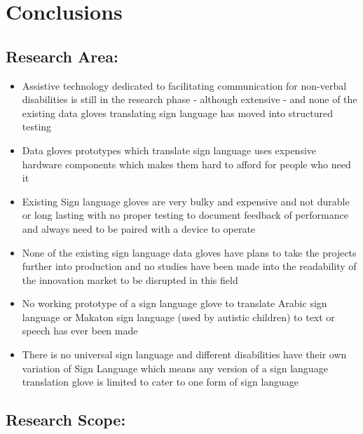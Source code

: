 
\chapter{Conclusions}

\section{Research Area:}

\begin{itemize}
    \item Assistive technology dedicated to facilitating communication for non-verbal disabilities is still in the research phase - although extensive - and none of the existing data gloves translating sign language has moved into structured testing 
    \item Data gloves prototypes which translate sign language uses expensive hardware components which makes them hard to afford for people who need it 
    \item Existing Sign language gloves are very bulky and expensive and not durable or long lasting with no proper testing to document feedback of performance and always need to be paired with a device to operate 
    \item None of the existing sign language data gloves have plans to take the projects further into production and no studies have been made into the readability of the innovation market to be disrupted in this field 
    \item No working prototype of a sign language glove to translate Arabic sign language or Makaton sign language (used by autistic children) to text or speech has ever been made
    \item There is no universal sign language and different disabilities have their own variation of Sign Language which means any version of a sign language translation glove is limited to cater to one form of sign language 
\end{itemize}

\section{Research Scope:}

